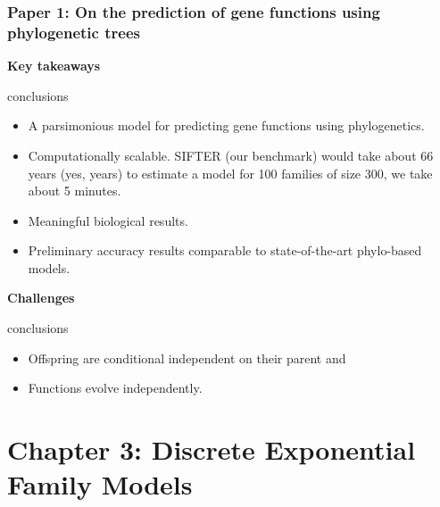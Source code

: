 \documentclass[aspectratio=169, 9pt]{beamer}
\begin{document}
\begin{frame}[t]
\frametitle{Paper 1: On the prediction of gene functions using phylogenetic trees}

{\bf \large Key takeaways}
\begin{beamercolorbox}[dp=1ex]{conclusions}
\begin{itemize}
\item A parsimonious model for predicting gene functions using phylogenetics.
\item Computationally scalable. SIFTER (our benchmark)
would take about 66 years (yes, years) to estimate a model for 100 families
of size 300, we take about 5 minutes.
\item Meaningful biological results.
\item Preliminary accuracy results comparable to state-of-the-art phylo-based models.
\end{itemize}
\end{beamercolorbox}\pause

{\bf \large Challenges}
\begin{beamercolorbox}[dp=1ex]{conclusions}
\begin{itemize}
\item Offspring are conditional independent on their parent and\pause{}
\item Functions evolve independently. \hyperlink{duplicationvsspeciation}{}
\end{itemize}
\end{beamercolorbox}

\end{frame}


\section{Chapter 3: Discrete Exponential Family Models}

\end{document}
